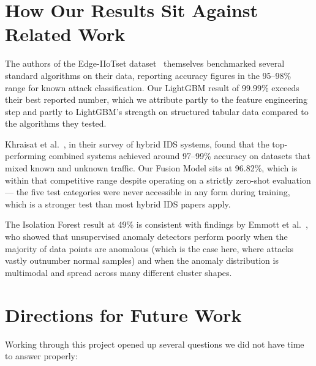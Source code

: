 \documentclass[12pt,a4paper]{report}
\begin{document}
\section{How Our Results Sit Against Related Work}

The authors of the Edge-IIoTset dataset~\cite{dataset_edge_iiotset} themselves
benchmarked several standard algorithms on their data, reporting accuracy figures
in the 95--98\% range for known attack classification. Our LightGBM result of
99.99\% exceeds their best reported number, which we attribute partly to the
feature engineering step and partly to LightGBM's strength on structured tabular
data compared to the algorithms they tested.

\noindent Khraisat et al.~\cite{hybrid_survey}, in their survey of hybrid IDS
systems, found that the top-performing combined systems achieved around 97--99\%
accuracy on datasets that mixed known and unknown traffic. Our Fusion Model sits
at 96.82\%, which is within that competitive range despite operating on a strictly
zero-shot evaluation --- the five test categories were never accessible in any
form during training, which is a stronger test than most hybrid IDS papers apply.

\noindent The Isolation Forest result at 49\% is consistent with findings by
Emmott et al.~\cite{iforest_limits}, who showed that unsupervised anomaly detectors
perform poorly when the majority of data points are anomalous (which is the case
here, where attacks vastly outnumber normal samples) and when the anomaly distribution
is multimodal and spread across many different cluster shapes.

\section{Directions for Future Work}

Working through this project opened up several questions we did not have time to
answer properly:
\end{document}
